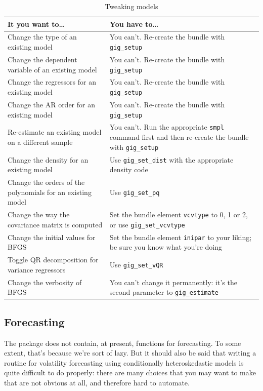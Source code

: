 \documentclass[a4paper,11pt]{article}
\begin{document}
\begin{table}[htbp]
  \centering
  \begin{tabular}{p{}p{}}
    \hline
    \hline
    \textbf{It you want to\ldots} &
    \textbf{You have to\ldots} \\
    \hline
    Change the type of an existing model &
    You can't. Re-create the bundle with \texttt{gig\_setup} \\
    Change the dependent variable of an existing model &
    You can't. Re-create the bundle with \texttt{gig\_setup} \\
    Change the regressors for an existing model &
    You can't. Re-create the bundle with \texttt{gig\_setup} \\
    Change the AR order for an existing model &
    You can't. Re-create the bundle with \texttt{gig\_setup} \\
    Re-estimate an existing model on a different sample &
    You can't. Run the appropriate \texttt{smpl} command first 
    and then re-create the bundle with \texttt{gig\_setup} \\
    Change the density for an existing model &
    Use \texttt{gig\_set\_dist} with the appropriate density code \\
    Change the orders of the polynomials for an existing model &
    Use \texttt{gig\_set\_pq} \\
    Change the way the covariance matrix is computed &
    Set the bundle element \texttt{vcvtype} to 0, 1 or 2, or use
    \texttt{gig\_set\_vcvtype} \\
    Change the initial values for BFGS &
    Set the bundle element \texttt{inipar} to your liking; be sure you
    know what you're doing \\
    Toggle QR decomposition for variance regressors &
    Use \texttt{gig\_set\_vQR} \\
    Change the verbosity of BFGS &
    You can't change it permanently: it's the second parameter to 
    \texttt{gig\_estimate} \\
    \hline
    \hline
  \end{tabular}
  \caption{Tweaking models}
  \label{tab:tweaks}
\end{table}

\subsection{Forecasting}
\label{sec:forecast}

The package does not contain, at present, functions for
forecasting. To some extent, that's because we're sort of lazy. But it
should also be said that writing a routine for volatility forecasting
using conditionally heteroskedastic models is quite difficult to do
properly: there are many choices that you may want to
make that are not obvious at all, and therefore hard to automate.
\end{document}
